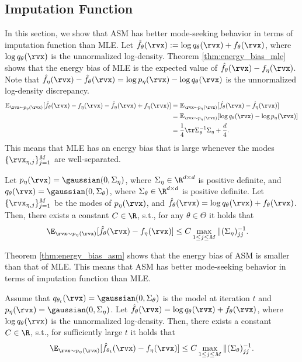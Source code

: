 \subsection{Imputation Function}
\label{sec:imputation}
In this section, we show that ASM has better mode-seeking behavior in terms of imputation function than MLE. Let $\hat{f}_{\theta}(\rvx) := \log q_{\theta}(\rvx) + f_{\theta}(\rvx)$, where $\log q_{\theta}(\rvx)$ is the unnormalized log-density. Theorem \ref{thm:energy_bias_mle} shows that the energy bias of MLE is the expected value of $\hat{f}_{\theta}(\rvx) - f_{\eta}(\rvx)$. Note that $\hat{f}_{\eta}(\rvx) - \hat{f}_{\theta}(\rvx) = \log p_{\eta}(\rvx) - \log q_{\theta}(\rvx)$ is the unnormalized log-density discrepancy.
\begin{align*}
	\mathbb{E}_{\rvx \sim p_{\eta}(\rvx)}[ \hat{f}_{\theta}(\rvx) - f_{\eta}(\rvx) - \hat{f}_{\eta}(\rvx) + f_{\eta}(\rvx) ] &= \mathbb{E}_{\rvx \sim p_{\eta}(\rvx)}[ \hat{f}_{\theta}(\rvx) - \hat{f}_{\eta}(\rvx) ] \\
	&= \mathbb{E}_{\rvx \sim p_{\eta}(\rvx)}[ \log q_{\theta}(\rvx) - \log p_{\eta}(\rvx) ] \\
	&= \frac{1}{4} \tr \Sigma_{\theta}^{-1} \Sigma_{\eta} + \frac{d}{4}.
\end{align*}
This means that MLE has an energy bias that is large whenever the modes $\{\rvx_{\eta, j}\}_{j=1}^{M}$ are well-separated.
\begin{theorem}%
	\label{thm:energy_bias_mle}
	\citep{TingLi2023} Let $p_{\eta}(\rvx) = \gaussian(0, \Sigma_{\eta})$, where $\Sigma_{\eta} \in \R^{d \times d}$ is positive definite, and $q_{\theta}(\rvx) = \gaussian(0, \Sigma_{\theta})$, where $\Sigma_{\theta} \in \R^{d \times d}$ is positive definite. Let $\{\rvx_{\eta, j}\}_{j=1}^{M}$ be the modes of $p_{\eta}(\rvx)$, and $\hat{f}_{\theta}(\rvx) = \log q_{\theta}(\rvx) + f_{\theta}(\rvx)$. Then, there exists a constant $C \in \R$, s.t., for any $\theta \in \Theta$ it holds that
	\begin{align*}
		\E_{\rvx \sim p_{\eta}(\rvx)}[\hat{f}_{\theta}(\rvx) - f_{\eta}(\rvx)] &\leq C \max_{1 \leq j \leq M} \|(\Sigma_{\eta})^{-1}_{jj}.
	\end{align*}
\end{theorem}
Theorem \ref{thm:energy_bias_asm} shows that the energy bias of ASM is smaller than that of MLE. This means that ASM has better mode-seeking behavior in terms of imputation function than MLE.
\begin{theorem}%
	\label{thm:energy_bias_asm}
	Assume that $q_{\theta_{t}}(\rvx) = \gaussian(0, \Sigma_{\theta})$ is the model at iteration $t$ and $p_{\eta}(\rvx) = \gaussian(0, \Sigma_{\eta})$. Let $\hat{f}_{\theta}(\rvx) = \log q_{\theta}(\rvx) + f_{\theta}(\rvx)$, where $\log q_{\theta}(\rvx)$ is the unnormalized log-density. Then, there exists a constant $C \in \R$, s.t., for sufficiently large $t$ it holds that
	\begin{align*}
		\E_{\rvx \sim p_{\eta}(\rvx)}[\hat{f}_{\theta_{t}}(\rvx) - f_{\eta}(\rvx)] \leq C \max_{1 \leq j \leq M} \|(\Sigma_{\theta})^{-1}_{jj}.
	\end{align*}
\end{theorem}




